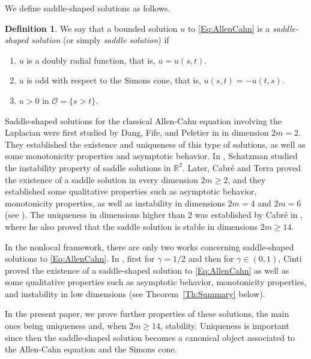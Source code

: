 \documentclass[twoside,leqno,symbols-for-thanks, draft]{rmi}
\numberwithin{equation}{section}
\theoremstyle{definition}
\newtheorem{definition}[theorem]{Definition}
\newcommand{\con}[1]{\mathbb{#1}}
\newcommand{\R}{\con{R}} %
\newcommand{\ocal}{\mathcal{O}}
\newcommand{\s}{\gamma}
\begin{document}
We define saddle-shaped solutions as follows.

\begin{definition}
	\label{Def:SaddleShapedSol}
	We say that a bounded solution $u$ to \eqref{Eq:AllenCahn} is a \emph{saddle-shaped solution} (or simply \emph{saddle solution}) if
	\begin{enumerate}[label=(\roman{*})]
		\item $u$ is a doubly radial function, that is, $u = u(s,t)$.
		\item $u$ is odd with respect to the Simons cone, that is, $u(s,t)=-u(t,s)$.
		\item $u > 0$ in $\ocal = \{s>t\}$.
	\end{enumerate}
\end{definition}

Saddle-shaped solutions for the classical Allen-Cahn equation involving the Laplacian were first studied by Dang, Fife, and Peletier in \cite{DangFifePeletier} in dimension $2m=2$. They established the existence and uniqueness of this type of solutions, as well as some monotonicity properties and asymptotic behavior. In \cite{Schatzman}, Schatzman studied the instability property of saddle solutions in $\R^2$. Later, Cabr\'e and Terra  proved the existence of a saddle solution in every dimension $2m\geq 2$, and they established some qualitative properties such as asymptotic behavior, monotonicity properties, as well as instability in dimensions $2m = 4$ and $2m = 6$ (see \cite{CabreTerraI,CabreTerraII}). The uniqueness in dimensions higher than $2$ was established by Cabr\'e in \cite{Cabre-Saddle}, where he also proved that the saddle solution is stable in dimensions $2m \geq 14$.

In the nonlocal framework, there are only two works concerning saddle-shaped solutions to \eqref{Eq:AllenCahn}. In  \cite{Cinti-Saddle,Cinti-Saddle2}, first for $\s=1/2$ and then for $\s\in(0,1)$, Cinti proved the existence of a saddle-shaped solution to \eqref{Eq:AllenCahn} as well as some qualitative properties such as asymptotic behavior, monotonicity properties, and instability in low dimensions (see Theorem~\ref{Th:Summary} below). 

In the present paper, we prove further properties of these solutions, the main ones being uniqueness and, when $2m\geq 14$, stability. Uniqueness is important since then the saddle-shaped solution becomes a canonical object associated to the Allen-Cahn equation and the Simons cone. 
\end{document}
